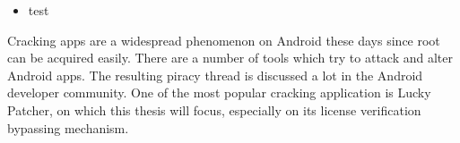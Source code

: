 \begin{itemize}
    \item test
\end{itemize}
Cracking apps are a widespread phenomenon on Android these days since root can be acquired easily.
There are a number of tools which try to attack and alter Android apps.
The resulting piracy thread is discussed a lot in the Android developer community.
One of the most popular cracking application is Lucky Patcher, on which this thesis will focus, especially on its license verification bypassing mechanism.
